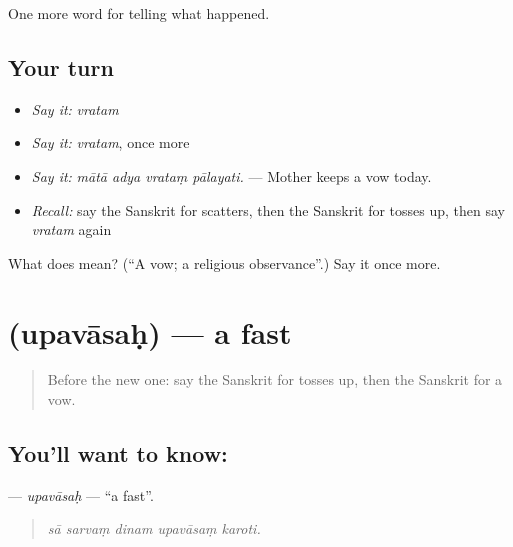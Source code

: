 \begin{grammarlens}[title={What you've built}]
One more word for telling what happened.
\end{grammarlens}

\subsection*{Your turn}
\begin{itemize}
\raggedright
  \item \emph{Say it:} \emph{vratam}
  \item \emph{Say it:} \emph{vratam}, once more
  \item \emph{Say it:} \emph{mātā adya vrataṃ pālayati.} — Mother keeps a vow today.
  \item \emph{Recall:} say the Sanskrit for scatters, then the Sanskrit for tosses up, then say \emph{vratam} again
\end{itemize}

\begin{tcolorbox}[breakable,colback=teal!4,colframe=teal!35!black,title={Before you move on}]
What does  mean? (\textquotedblleft{}A vow; a religious observance\textquotedblright{}.) Say it once more.
\end{tcolorbox}
\section[\texorpdfstring{\sk{उपवासः} (upavāsaḥ)}{उपवासः (upavāsaḥ)}]{ (upavāsaḥ) — a fast}

\label{lesson:SA-C328-upavasah}



\begin{quote}
Before the new one: say the Sanskrit for tosses up, then the Sanskrit for a vow.
\end{quote}

\subsection*{You'll want to know: }
\textbf{} — \emph{upavāsaḥ} — \textquotedblleft{}a fast\textquotedblright{}.

\begin{quote}
    
\end{quote}

\begin{quote}
\emph{sā sarvaṃ dinam upavāsaṃ karoti.}
\end{quote}


